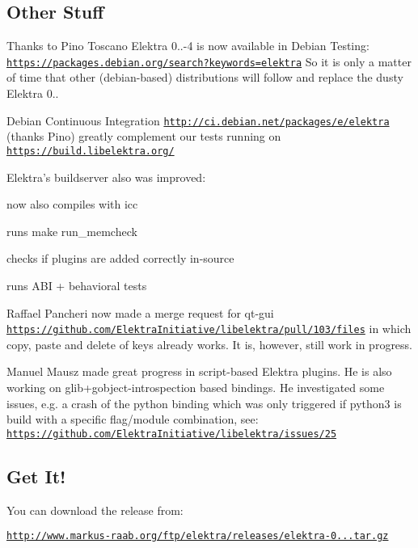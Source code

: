 \subsection*{Other Stuff}

Thanks to Pino Toscano Elektra 0..-\/4 is now available in Debian Testing\+: \href{https://packages.debian.org/search?keywords=elektra}{\tt https\+://packages.\+debian.\+org/search?keywords=elektra} So it is only a matter of time that other (debian-\/based) distributions will follow and replace the dusty Elektra 0..

Debian Continuous Integration \href{http://ci.debian.net/packages/e/elektra}{\tt http\+://ci.\+debian.\+net/packages/e/elektra} (thanks Pino) greatly complement our tests running on \href{https://build.libelektra.org/}{\tt https\+://build.\+libelektra.\+org/}

Elektra’s buildserver also was improved\+:


\begin{DoxyItemize}
\item now also compiles with icc
\item runs {\ttfamily make run\+\_\+memcheck}
\item checks if plugins are added correctly in-\/source
\item runs A\+BI + behavioral tests
\end{DoxyItemize}

Raffael Pancheri now made a merge request for qt-\/gui \href{https://github.com/ElektraInitiative/libelektra/pull/103/files}{\tt https\+://github.\+com/\+Elektra\+Initiative/libelektra/pull/103/files} in which copy, paste and delete of keys already works. It is, however, still work in progress.

Manuel Mausz made great progress in script-\/based Elektra plugins. He is also working on glib+gobject-\/introspection based bindings. He investigated some issues, e.\+g. a crash of the python binding which was only triggered if python3 is build with a specific flag/module combination, see\+: \href{https://github.com/ElektraInitiative/libelektra/issues/25}{\tt https\+://github.\+com/\+Elektra\+Initiative/libelektra/issues/25}

\subsection*{Get It!}

You can download the release from\+:

\href{http://www.markus-raab.org/ftp/elektra/releases/elektra-0.8.8.tar.gz}{\tt http\+://www.\+markus-\/raab.\+org/ftp/elektra/releases/elektra-\/0...\+tar.\+gz}


